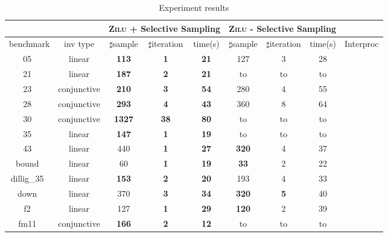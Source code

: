 \begin{table}[t]
\scriptsize
\centering
\caption{Experiment results}
\begin{tabular}{l c | c c c | c c c | c }
\cline{3-8}
& &\multicolumn{3}{|c|}{\textsc{Zilu} + Selective Sampling}&\multicolumn{3}{c|}{\textsc{Zilu} - Selective Sampling} & \\
\hline
\multicolumn{1}{|c|}{benchmark}&\multicolumn{1}{|c|}{inv type}& $\sharp$sample & $\sharp$iteration & time(s) & $\sharp$sample & $\sharp$iteration &time(s) & \multicolumn{1}{|c|}{Interproc} \\
\hline
\multicolumn{1}{|c|}{05~\cite{}}				&linear 			& \textbf{113} & \textbf{1} &\textbf{21}	& 127 & 3  & 28	&\multicolumn{1}{|c|}{\cmark} \\
\multicolumn{1}{|c|}{21~\cite{}}				&linear 			& \textbf{187} & \textbf{2} & \textbf{21}	& to & to & to & \multicolumn{1}{|c|}{\cmark} \\
\multicolumn{1}{|c|}{23~\cite{}}				&conjunctive		& \textbf{210} & \textbf{3} & \textbf{54}	& 280 & 4 & 55 &\multicolumn{1}{|c|}{\cmark} \\
\multicolumn{1}{|c|}{28~\cite{}}				&conjunctive		& \textbf{293} & \textbf{4} &\textbf{43}	& 360 & 8 & 64 &\multicolumn{1}{|c|}{\cmark} \\
\multicolumn{1}{|c|}{30~\cite{}}				&conjunctive		& \textbf{1327} & \textbf{38} & \textbf{80} & to & to & to &\multicolumn{1}{|c|}{\cmark} \\
\multicolumn{1}{|c|}{35~\cite{}}				&linear 			& \textbf{147} & \textbf{1} &\textbf{19}	& to & to & to &\multicolumn{1}{|c|}{\cmark} \\
\multicolumn{1}{|c|}{43~\cite{}}				&linear 			& 440 & \textbf{1} &\textbf{27}	& \textbf{320} & 4   & 37 &\multicolumn{1}{|c|}{\cmark} \\
\multicolumn{1}{|c|}{bound~\cite{}}				&linear 			& 60 & \textbf{1} &\textbf{19}	& \textbf{33} & 2 & 22 &\multicolumn{1}{|c|}{\cmark} \\
\multicolumn{1}{|c|}{dillig\_35~\cite{}}		&linear 			& \textbf{153} & \textbf{2} &\textbf{20}	&193 &4  & 33 &\multicolumn{1}{|c|}{\cmark} \\
\multicolumn{1}{|c|}{down~\cite{}}				&linear 			& 370 & \textbf{3} &\textbf{34}	& \textbf{320} & \textbf{5} & 40 &\multicolumn{1}{|c|}{\cmark} \\
\multicolumn{1}{|c|}{f2~\cite{}}				&linear 			& 127 & \textbf{1} &\textbf{29}	& \textbf{120} & 2 & 39 &\multicolumn{1}{|c|}{\cmark} \\
\multicolumn{1}{|c|}{fm11~\cite{}}				&conjunctive		& \textbf{166} & \textbf{2} &\textbf{12}	& to & to  & to	&\multicolumn{1}{|c|}{\cmark} \\

\end{tabular}
\end{table}
